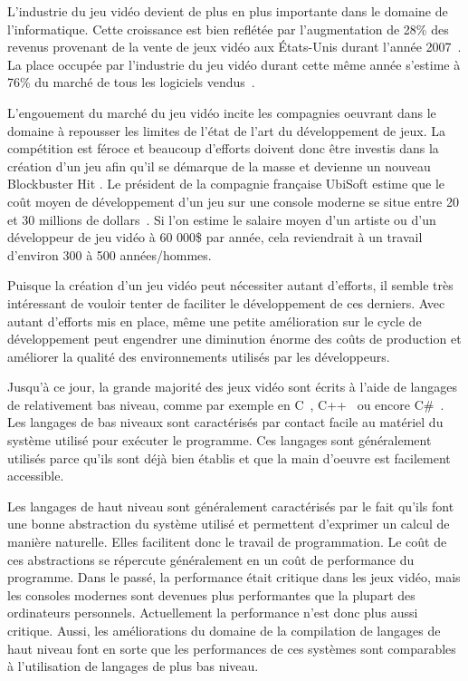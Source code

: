 \documentclass[12pt,oneside,letterpaper,francais]{book}
\begin{document}
L'industrie du jeu vidéo devient de plus en plus importante dans le
domaine de l'informatique. Cette croissance est bien reflétée par
l'augmentation de 28\% des revenus provenant de la vente de jeux vidéo
aux États-Unis durant l'année 2007~\cite{NPD_Games_2007}. La place
occupée par l'industrie du jeu vidéo durant cette même année s'estime
à 76\% du marché de tous les logiciels vendus~\cite{NPD_Soft_2008}. 

L'engouement du marché du jeu vidéo incite les compagnies oeuvrant
dans le domaine à repousser les limites de l'état de l'art du
développement de jeux. La compétition est féroce et beaucoup
d'efforts doivent donc être investis dans la création d'un jeu afin qu'il
se démarque de la masse et devienne un nouveau \og Blockbuster Hit
\fg. Le président de la compagnie française UbiSoft estime que le coût
moyen de développement d'un jeu sur une console moderne se situe entre
20 et 30 millions de dollars~\cite{cbc_ubisoft}. Si l'on estime le
salaire moyen d'un artiste ou d'un développeur de jeu vidéo à 60
000\$ par année, cela reviendrait à un travail d'environ 300 à 500
années/hommes.

Puisque la création d'un jeu vidéo peut nécessiter autant d'efforts,
il semble très intéressant de vouloir tenter de faciliter le
développement de ces derniers. Avec autant d'efforts mis en place,
même une petite amélioration sur le cycle de développement peut
engendrer une diminution énorme des coûts de production et améliorer
la qualité des environnements utilisés par les développeurs.

Jusqu'à ce jour, la grande majorité des jeux vidéo sont écrits à
l'aide de langages de relativement bas niveau, comme par exemple en
C~\cite{Ritchie-C-dev}, C++~\cite{cplusplus} ou encore
C\#~\cite{CSHARP_SPEC}. Les langages de bas niveaux sont caractérisés
par contact facile au matériel du système utilisé pour exécuter le
programme. Ces langages sont généralement utilisés parce qu'ils sont
déjà bien établis et que la main d'oeuvre est facilement accessible.

Les langages de haut niveau sont généralement caractérisés par le fait
qu'ils font une bonne abstraction du système utilisé et permettent
d'exprimer un calcul de manière naturelle. Elles facilitent donc le
travail de programmation. Le coût de ces abstractions se répercute
généralement en un coût de performance du programme. Dans le passé, la
performance était critique dans les jeux vidéo, mais les consoles
modernes sont devenues plus performantes que la plupart des
ordinateurs personnels. Actuellement la performance n'est donc plus
aussi critique. Aussi, les améliorations du domaine de la compilation
de langages de haut niveau font en sorte que les performances de ces
systèmes sont comparables à l'utilisation de langages de plus bas
niveau.
\end{document}

